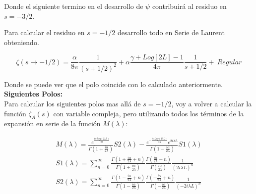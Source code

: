 Donde el siguiente termino en el desarrollo de $ \psi $ contribuirá al residuo en $s = -3/2$.

Para calcular el residuo en $s=-1/2$ desarrollo todo en Serie de Laurent obteniendo.

\begin{equation}
	\zeta (s \rightarrow -1/2) = 
     \frac{\alpha}{8 \pi} \frac{1}{(s+1/2)^2} + 
    \alpha \frac{\gamma + Log[2 L] - 1}{4 \pi} \frac{1}{s+1/2} + \ Regular
\label{eq.desarrollo}
\end{equation}

Donde se puede ver que el polo coincide con lo calculado anteriormente. \\


\textbf{Siguientes Polos:} \\

Para calcular los siguientes polos mas allá de $s=-1/2$, voy a volver a calcular la función $\zeta _A (s) $ con variable compleja, pero utilizando todos los términos de la expansión en serie de la función $M ( \lambda )$:

\begin{equation}
\begin{array}{c}
M( \lambda ) = 
 \frac{ e ^{   \frac{i \alpha Log \left(2 \lambda L \right) } 
           {2 \lambda } } }
      { \Gamma \left( 1 + \frac{i \alpha}{2 \lambda}  \right)   } S2 ( \lambda ) -
 \frac{e ^{ - \frac{i \alpha Log \left( 2 \lambda L \right) }{2 \lambda } } e ^{2 i \lambda L } }
      { \Gamma \left( 1 - \frac{i \alpha}{2 \lambda}  \right) } S1 ( \lambda ) \\
      
S1 ( \lambda ) = \sum _{n=0} ^{ \infty }
\frac{\Gamma (1 + \frac{i \alpha}{2 \lambda} + n )}{\Gamma (1 + \frac{i \alpha}{2 \lambda})} 
\frac{\Gamma (\frac{i \alpha}{2 \lambda} + n )}{\Gamma (\frac{i \alpha}{2 \lambda})} 
\frac{1}{( 2 i \lambda L ) ^n} \\

S2 (\lambda ) = \sum _{n=0 } ^{\infty}
\frac{ \Gamma ( 1- \frac{i \alpha}{2 \lambda } + n ) }{\Gamma ( 1- \frac{i \alpha}{2 \lambda } )}
\frac{\Gamma (- \frac{i \alpha }{2 \lambda} + n )}{\Gamma (- \frac{i \alpha }{2 \lambda} )}
\frac{1}{( - 2 i \lambda L ) ^n}
\end{array}
\end{equation}

